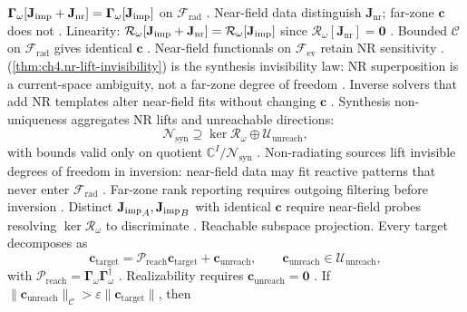 \(\boldsymbol{\Gamma}_\omega[\mathbf{J}_{\mathrm{imp}}+\mathbf{J}_{\mathrm{nr}}]=\boldsymbol{\Gamma}_\omega[\mathbf{J}_{\mathrm{imp}}]\) on \(\mathcal{F}_{\mathrm{rad}}\)
\cite{stratton1941}. Near-field data distinguish \(\mathbf{J}_{\mathrm{nr}}\); far-zone \(\mathbf{c}\) does not \cite{devaney2004}.
Linearity: \(\mathcal{R}_\omega[\mathbf{J}_{\mathrm{imp}}+\mathbf{J}_{\mathrm{nr}}]=\mathcal{R}_\omega[\mathbf{J}_{\mathrm{imp}}]\) since \(\mathcal{R}_\omega[\mathbf{J}_{\mathrm{nr}}]=\mathbf{0}\)
\cite{stratton1941}. Bounded \(\mathcal{C}\) on \(\mathcal{F}_{\mathrm{rad}}\) gives identical \(\mathbf{c}\) \cite{hansen1988}. Near-field
functionals on \(\mathcal{F}_{\mathrm{ev}}\) retain NR sensitivity \cite{devaney2004}.
(\ref{thm:ch4.nr-lift-invisibility}) is the synthesis invisibility law: NR superposition is a current-space ambiguity, not a far-zone degree of
freedom \cite{stratton1941}. Inverse solvers that add NR templates alter near-field fits without changing \(\mathbf{c}\)
\cite{devaney2004}.
Synthesis non-uniqueness aggregates NR lifts and unreachable directions:
\begin{equation}
\label{eq:ch4.nr-unreachable-composition}
\mathcal{N}_{\mathrm{syn}}\supseteq\ker\mathcal{R}_\omega\oplus\mathcal{U}_{\mathrm{unreach}},
\end{equation}
with bounds valid only on quotient \(\mathbb{C}^{I}/\mathcal{N}_{\mathrm{syn}}\) \cite{stratton1941}.
Non-radiating sources lift invisible degrees of freedom in inversion: near-field data may fit reactive patterns that never enter $\mathcal{F}_{\mathrm{rad}}$ \cite{devaney2004}. Far-zone rank reporting requires outgoing filtering before inversion \cite{hansen1988}.
\label{lem:ch4.nf-discrimination}
Distinct \({\mathbf{J}_{\mathrm{imp}}}_{A},{\mathbf{J}_{\mathrm{imp}}}_{B}\) with identical \(\mathbf{c}\) require near-field probes resolving \(\ker\mathcal{R}_\omega\) to discriminate
\cite{harrington2001}.
Reachable subspace projection. Every target decomposes as
\begin{equation}
\label{eq:ch4.reachable-projection}
\mathbf{c}_{\mathrm{target}}=\mathcal{P}_{\mathrm{reach}}\mathbf{c}_{\mathrm{target}}+\mathbf{c}_{\mathrm{unreach}},\qquad
\mathbf{c}_{\mathrm{unreach}}\in\mathcal{U}_{\mathrm{unreach}},
\end{equation}
with \(\mathcal{P}_{\mathrm{reach}}=\boldsymbol{\Gamma}_\omega\boldsymbol{\Gamma}_\omega^{\dagger}\) \cite{harrington2001}.
Realizability requires \(\mathbf{c}_{\mathrm{unreach}}=\mathbf{0}\) \cite{hansen1988}.
\label{thm:ch4.unreachable-obstruction}
If \(\|\mathbf{c}_{\mathrm{unreach}}\|_{\mathcal{C}}>\varepsilon\|\mathbf{c}_{\mathrm{target}}\|\), then
